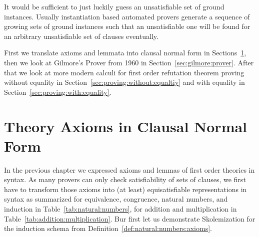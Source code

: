 
It would be sufficient to just luckily guess an unsatisfiable set of ground instances.
Usually instantiation based automated provers generate
a sequence of growing sets of ground instances
such that an unsatisfiable one will be found
for an arbitrary unsatisfiable set of clauses
eventually.

First we translate axioms and lemmata into clausal normal form in Sections~\ref{sec:clausal:normal:form},
then we look at Gilmore's Prover from 1960 in Section~\ref{sec:gilmore:prover}.
After that we look at more modern calculi for first order refutation theorem proving
without equality in Section~\ref{sec:proving:without:equaltiy} and with equality in Section~\ref{sec:proving:with:equality}.


%
%
%

%
%

\section{Theory Axioms in Clausal Normal Form}\label{sec:clausal:normal:form}

In the previous chapter we expressed axioms and lemmas of first order theories in \FOF{} syntax.
As many provers can only check satisfiability of sets of clauses, 
we first have to transform
those axioms into (at least) equisatisfiable representations in \CNF{} syntax
as summarized for equivalence, congruence, natural numbers, and induction in Table~\vref{tab:natural:numbers},
for addition and multiplication in Table~\vref{tab:addition:multiplication}.
Bur first let us demonstrate Skolemization for the induction schema from Definition~\vref{def:natural:numbers:axioms}.

